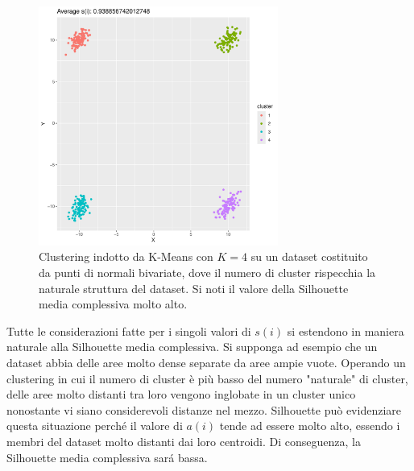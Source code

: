 \documentclass[a4paper, 12pt]{report}
\begin{document}
			\begin{figure}[H]
				\centering
				\includegraphics[width = 0.7\textwidth]{doc/clusters-4.pdf}
				\caption{Clustering indotto da K-Means con $K = 4$ su un
				dataset costituito da punti di normali bivariate, dove
				il numero di cluster rispecchia la naturale struttura
				del dataset. Si noti il valore della Silhouette media
				complessiva molto alto.}
				\label{fig:k4}
			\end{figure}

			Tutte le considerazioni fatte per i singoli valori di $s(i)$
			si estendono in maniera naturale alla Silhouette media
			complessiva. Si supponga ad esempio che un dataset abbia
			delle aree molto dense separate da aree ampie vuote. Operando
			un clustering in cui il numero di cluster è più basso del numero
			"naturale" di cluster, delle aree molto distanti tra loro vengono
			inglobate in un cluster unico nonostante vi siano considerevoli
			distanze nel mezzo. Silhouette può evidenziare questa situazione
			perché il valore di $a(i)$ tende ad essere molto alto, essendo
			i membri del dataset molto distanti dai loro centroidi. Di
			conseguenza, la Silhouette media complessiva sará bassa.
\end{document}
